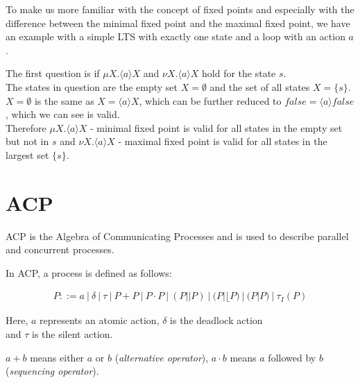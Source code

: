 \documentclass{clseminar}
\begin{document}
  To make us more familiar with the concept of fixed points and especially with the difference between the minimal fixed point and the maximal fixed point, we have an example with a simple LTS with exactly one state and a loop with an action $a$. \\

  \begin{center}
  \end{center}

  \begin{example}
    The first question is if $\mu X. \langle a \rangle X$ and $\nu X. \langle a \rangle X$ hold for the state $s$. \\
    The states in question are the empty set $X = \emptyset$ and the set of all states $X = \{s\}$. \\
    $X = \emptyset$ is the same as $X = \langle a \rangle X$, which can be further reduced to $\mathit{false} = \langle a \rangle \mathit{false}$, which we can see is valid. \\
    Therefore $\mu X. \langle a \rangle X$ - minimal fixed point is valid for all states in the empty set but not in $s$ and $\nu X. \langle a \rangle X$ - maximal fixed point is valid for all states in the largest set $\{s\}$.
  \end{example}

  \section{ACP}

  ACP is the Algebra of Communicating Processes and is used to describe parallel and concurrent processes.

  In ACP, a process is defined \cite{acp_wiki} as follows:

  \begin{align*}
    P ::= a\ |\ \delta\ |\ \tau\ |\ P + P\ |\ P \cdot P\ |\ (P || P)\ |\ (P |\lfloor P)\ |\ (P | P)\ |\ \tau_I(P)
  \end{align*}

  Here, $a$ represents an atomic action, $\delta$ is the deadlock action \\ and $\tau$ is the silent action.

  $a + b$ means either $a$ or $b$ (\textit{alternative operator}), $a \cdot b$ means $a$ followed by $b$ (\textit{sequencing operator}).
\end{document}
